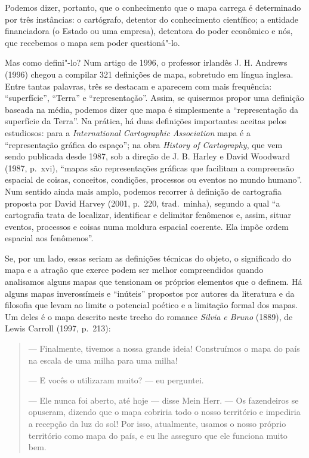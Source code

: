 Podemos dizer, portanto, que o conhecimento que o mapa carrega é
determinado por três instâncias: o cartógrafo, detentor do conhecimento
científico; a entidade financiadora (o Estado ou uma empresa), detentora do poder
econômico e nós, que recebemos o mapa sem poder questioná"-lo.

Mas como defini"-lo? Num artigo de 1996, o professor irlandês J. H.
Andrews (1996) chegou a compilar 321 definições de mapa, sobretudo em
língua inglesa. Entre tantas palavras, três se destacam e aparecem com
mais frequência: ``superfície'', ``Terra'' e ``representação''. Assim,
se quisermos propor uma definição baseada na média, podemos dizer que
mapa é simplesmente a ``representação da superfície da Terra''. Na
prática, há duas definições importantes aceitas pelos estudiosos: para a
\emph{International Cartographic Association} mapa é a
``representação gráfica do espaço''; na obra \emph{History of
Cartography}, que vem sendo publicada desde 1987, sob a direção de J. B.
Harley e David Woodward (1987, p.~xvi), ``mapas são representações
gráficas que facilitam a compreensão espacial de coisas, conceitos,
condições, processos ou eventos no mundo humano''. Num sentido ainda
mais amplo, podemos recorrer à definição de cartografia proposta por
David Harvey (2001, p.~220, trad.~minha), segundo a qual ``a cartografia \label{harvey}
trata de localizar, identificar e delimitar fenômenos e, assim, situar
eventos, processos e coisas numa moldura espacial coerente. Ela impõe
ordem espacial aos fenômenos''.

Se, por um lado, essas seriam as definições técnicas do objeto, o
significado do mapa e a atração que exerce podem ser melhor
compreendidos quando analisamos alguns mapas que tensionam os próprios
elementos que o definem. Há alguns mapas inverossímeis e ``inúteis''
propostos por autores da literatura e da filosofia que levam ao limite o
potencial poético e a limitação formal dos mapas. Um deles é o mapa
descrito neste trecho do romance \emph{Silvia e Bruno} (1889), de Lewis Carroll (1997, p.~213):

\begin{quote}
--- Finalmente, tivemos a nossa grande ideia! Construímos o mapa do país
na escala de uma milha para uma milha!

--- E vocês o utilizaram muito? --- eu perguntei.

--- Ele nunca foi aberto, até hoje --- disse Mein Herr. --- Os fazendeiros
se opuseram, dizendo que o mapa cobriria todo o nosso território e
impediria a recepção da luz do sol! Por isso, atualmente, usamos o nosso
próprio território como mapa do país, e eu lhe asseguro que ele funciona
muito bem.
\end{quote}


